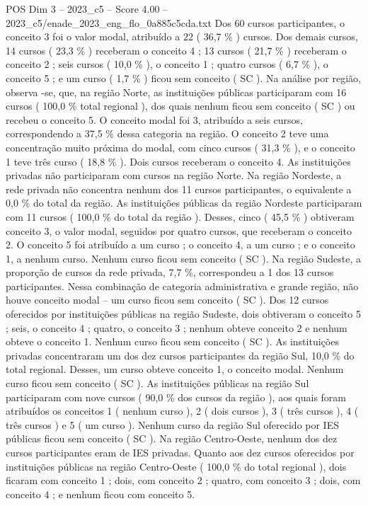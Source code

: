\begin{textsample}{POS Dim 3 – 2023\_c5 – Score 4.00 – 2023\_c5/enade\_2023\_eng\_flo\_0a885c5cda.txt}
Dos 60 cursos participantes, o conceito 3 foi o valor modal, atribuído a 22 ( 36,7 \% ) cursos.
Dos demais cursos, 14 cursos ( 23,3 \% ) receberam o conceito 4 ; 13 cursos ( 21,7 \% ) receberam o conceito 2 ; seis cursos ( 10,0 \% ), o conceito 1 ; quatro cursos ( 6,7 \% ), o conceito 5 ; e um curso ( 1,7 \% ) ficou sem conceito ( SC ).
Na análise por região, observa -se, que, na região Norte, as instituições públicas participaram com 16 cursos ( 100,0 \% total regional ), dos quais nenhum ficou sem conceito ( SC ) ou recebeu o conceito 5.
O conceito modal foi 3, atribuído a seis cursos, correspondendo a 37,5 \% dessa categoria na região.
O conceito 2 teve uma concentração muito próxima do modal, com cinco cursos ( 31,3 \% ), e o conceito 1 teve três curso ( 18,8 \% ).
Dois cursos receberam o conceito 4.
As instituições privadas não participaram com cursos na região Norte.
Na região Nordeste, a rede privada não concentra nenhum dos 11 cursos participantes, o equivalente a 0,0 \% do total da região.
As instituições públicas da região Nordeste participaram com 11 cursos ( 100,0 \% do total da região ).
Desses, cinco ( 45,5 \% ) obtiveram conceito 3, o valor modal, seguidos por quatro cursos, que receberam o conceito 2.
O conceito 5 foi atribuído a um curso ; o conceito 4, a um curso ; e o conceito 1, a nenhum curso.
Nenhum curso ficou sem conceito ( SC ).
Na região Sudeste, a proporção de cursos da rede privada, 7,7 \%, correspondeu a 1 dos 13 cursos participantes.
Nessa combinação de categoria administrativa e grande região, não houve conceito modal – um curso ficou sem conceito ( SC ).
Dos 12 cursos oferecidos por instituições públicas na região Sudeste, dois obtiveram o conceito 5 ; seis, o conceito 4 ; quatro, o conceito 3 ; nenhum obteve conceito 2 e nenhum obteve o conceito 1.
Nenhum curso ficou sem conceito ( SC ).
As instituições privadas concentraram um dos dez cursos participantes da região Sul, 10,0 \% do total regional.
Desses, um curso obteve conceito 1, o conceito modal.
Nenhum curso ficou sem conceito ( SC ).
As instituições públicas na região Sul participaram com nove cursos ( 90,0 \% dos cursos da região ), aos quais foram atribuídos os conceitos 1 ( nenhum curso ), 2 ( dois cursos ), 3 ( três cursos ), 4 ( três cursos ) e 5 ( um curso ).
Nenhum curso da região Sul oferecido por IES públicas ficou sem conceito ( SC ).
Na região Centro-Oeste, nenhum dos dez cursos participantes eram de IES privadas.
Quanto aos dez cursos oferecidos por instituições públicas na região Centro-Oeste ( 100,0 \% do total regional ), dois ficaram com conceito 1 ; dois, com conceito 2 ; quatro, com conceito 3 ; dois, com conceito 4 ; e nenhum ficou com conceito 5.

\end{textsample}
